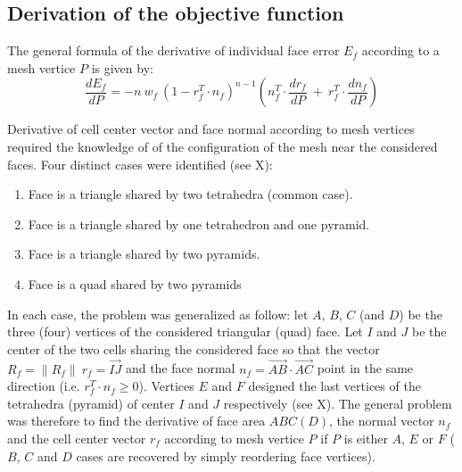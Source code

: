 \documentclass[11pt]{article}
\begin{document}
\subsection{Derivation of the objective function}

The general formula of the derivative of individual face error $E_f$ according to a mesh vertice $P$ is given by:
\begin{equation}
\frac{dE_f}{dP} = - n\ w_f\ \left( 1 - r_f^T \cdot n_f \right)^{n-1} \left(n_f^T \cdot \frac{d r_f}{dP}\ +\ r_f^T \cdot \frac{d n_f}{dP}\right)
\label{general_derivative_expression}
\end{equation}

Derivative of cell center vector and face normal according to mesh vertices required the knowledge of of the configuration of the mesh near the considered faces. Four distinct cases were identified (see X):
\begin{enumerate}
  \item Face is a triangle shared by two tetrahedra (common case). 
  \item Face is a triangle shared by one tetrahedron and one pyramid.
  \item Face is a triangle shared by two pyramids.
  \item Face is a quad shared by two pyramids
\end{enumerate}

In each case, the problem was generalized as follow: let $A$, $B$, $C$ (and $D$) be the three (four) vertices of the considered triangular (quad) face. 
Let $I$ and $J$ be the center of the two cells sharing the considered face so that the vector $R_f=\|R_f\|\ r_f = \overrightarrow{IJ}$ and the face normal $n_f = \overrightarrow{AB} \cdot \overrightarrow{AC}$ point in the same direction (i.e. $r_f^T \cdot n_f \geq 0$).
Vertices $E$ and $F$ designed the last vertices of the tetrahedra (pyramid) of center $I$ and $J$ respectively (see X).
The general problem was therefore to find the derivative of face area $ABC(D)$, the normal vector $n_f$ and the cell center vector $r_f$ according to mesh vertice $P$ if $P$ is either $A$, $E$ or $F$ ($B$, $C$ and $D$ cases are recovered by simply reordering face vertices). 
\end{document}
